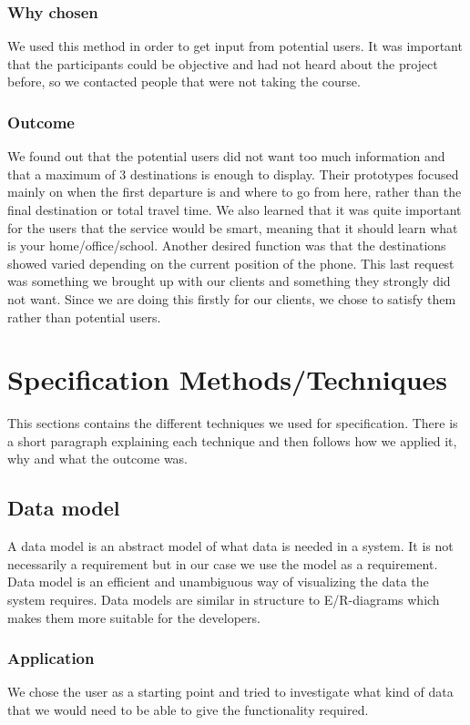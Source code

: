 \documentclass[a4paper]{article}
\begin{document}
		\subsubsection{Why chosen}
We used this method in order to get input from potential users. It was important that the participants could be objective and had not heard about the project before, so we contacted people that were not taking the course.
		\subsubsection{Outcome}
We found out that the potential users did not want too much information and that a maximum of 3 destinations is enough to display. Their prototypes focused mainly on when the first departure is and where to go from here, rather than the final destination or total travel time. We also learned that it was quite important for the users that the service would be smart, meaning that it should learn what is your home/office/school. Another desired function was that the destinations showed varied depending on the current position of the phone. This last request was something we brought up with our clients and something they strongly did not want. Since we are doing this firstly for our clients, we chose to satisfy them rather than potential users.
	
	\section{Specification Methods/Techniques}
This sections contains the different techniques we used for specification. There is a short paragraph explaining each technique and then follows how we applied it, why and what the outcome was.

		\subsection{Data model}
A data model is an abstract model of what data is needed in a system. It is not necessarily a requirement but in our case we use the model as a requirement. Data model is an efficient and unambiguous way of visualizing the data the system requires. Data models are similar in structure to E/R-diagrams which makes them more suitable for the developers.
	
		\subsubsection{Application}
		We chose the user as a starting point and tried to investigate what kind of data that we would need to be able to give the functionality required. 
\end{document}
